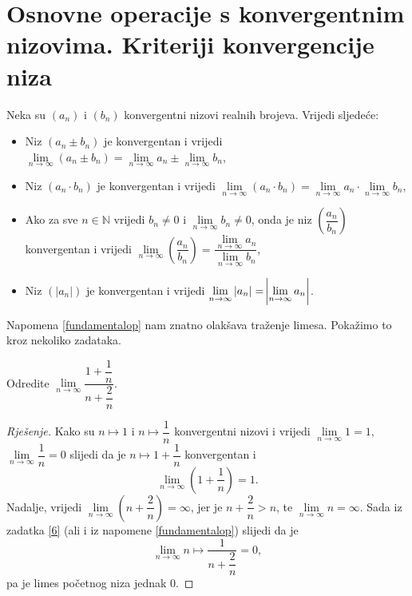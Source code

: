 \section{Osnovne operacije s konvergentnim nizovima. Kriteriji konvergencije niza}
\begin{remark}
\label{fundamentalop}
Neka su $(a_n)$ i $(b_n)$ konvergentni nizovi realnih brojeva. Vrijedi sljedeće:
\begin{itemize}
\item Niz $(a_n\pm b_n)$ je konvergentan i vrijedi $\lim\limits_{n\to \infty}(a_n\pm b_n)=\lim\limits_{n\to \infty}{a_n}\pm \lim\limits_{n\to \infty}{b_n}$,

\item Niz $(a_n\cdot b_n)$ je konvergentan i vrijedi $\lim\limits_{n\to \infty}(a_n\cdot b_n)=\lim\limits_{n\to \infty}{a_n}\cdot \lim\limits_{n\to \infty}{b_n}$,

\item Ako za sve $n\in \mathbb{N}$ vrijedi $b_n\neq 0$ i $\lim\limits_{n\to \infty}{b_n}\neq 0$, onda je niz $\left(\dfrac{a_n}{b_n}\right)$ konvergentan i vrijedi $\lim\limits_{n\to \infty}\left(\dfrac{a_n}{b_n}\right)=\dfrac{\lim\limits_{n\to \infty}{a_n}}{\lim\limits_{n\to \infty}{b_n}}$,

\item Niz $\left(|a_n|\right)$ je konvergentan i vrijedi $\lim\limits_{n\to \infty}{|a_n|}=\abs{\lim\limits_{n\to \infty}{a_n}}$.
\end{itemize}
\end{remark}
Napomena \ref{fundamentalop} nam znatno olakšava traženje limesa. Pokažimo to kroz nekoliko zadataka.
\begin{exercise}
Odredite $\lim\limits_{n\to \infty}{\dfrac{1+\dfrac{1}{n}}{n+\dfrac{2}{n}}}$.
\end{exercise}
\begin{proof}[Rješenje]
Kako su $n\mapsto 1$ i $n\mapsto \dfrac{1}{n}$ konvergentni nizovi i vrijedi $\lim\limits_{n\to \infty}{1}=1$, $\lim\limits_{n\to \infty}{\dfrac{1}{n}}=0$ slijedi da je $n\mapsto 1+\dfrac{1}{n}$ konvergentan i $$\lim\limits_{n\to \infty}\left(1+\dfrac{1}{n}\right)=1.$$ Nadalje, vrijedi $\lim\limits_{n\to \infty}\left(n+\dfrac{2}{n}\right)=\infty$, jer je $n+\dfrac{2}{n}>n$, te $\lim\limits_{n\to \infty}{n}=\infty$. Sada iz zadatka \ref{6} (ali i iz napomene \ref{fundamentalop}) slijedi da je $$\lim\limits_{n\to \infty}{n\mapsto \dfrac{1}{n+\dfrac{2}{n}}}=0,$$ pa je limes početnog niza jednak $0$.
\end{proof}
